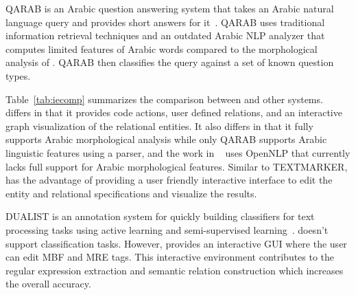QARAB is an Arabic question answering system that 
takes an Arabic natural language query and provides short answers for it~\cite{hammo2002qarab}. 
QARAB uses traditional information retrieval techniques and an outdated Arabic NLP 
analyzer that computes limited features of Arabic words compared 
to the morphological analysis of \framework. 
QARAB then classifies the query against a set of known question types. 

\begin{table}[tb!]
\caption{Comaprison of \framework with SystemT, 
TEXTMARKER, 
Urbain, 
QARAB}
\label{tab:iecomp}
\end{table}

Table~\ref{tab:iecomp} summarizes the comparison between \framework and
other systems. \framework differs in that it provides 
code actions, user defined relations, and an interactive 
graph visualization of the relational entities. 
It also differs in that it fully supports Arabic morphological analysis
while only QARAB supports Arabic linguistic features using a parser, and 
the work in ~\cite{urbain2012user} uses OpenNLP that currently lacks full
support for Arabic morphological features. 
Similar to TEXTMARKER, \framework has the advantage of providing 
a user friendly interactive interface to edit the entity and relational 
specifications and visualize the results. 

DUALIST is an annotation system for quickly building classifiers for 
text processing tasks using active learning and semi-supervised learning~\cite{settles2011closing}. 
\framework doesn't support classification tasks. 
However, \framework provides an interactive GUI where the user can edit MBF and MRE tags.
This interactive environment contributes to the regular expression extraction 
and semantic relation construction which increases the overall accuracy.

